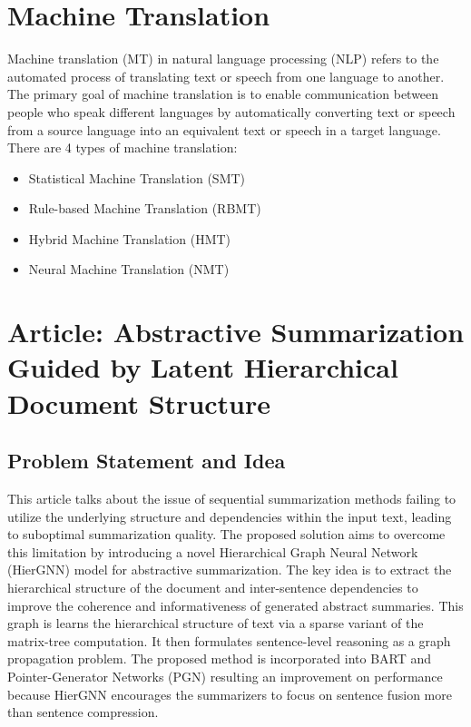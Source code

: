 \documentclass{article}
\begin{document}
\section{Machine Translation}
Machine translation (MT) in natural language processing (NLP) refers to the automated process of translating text or speech from one language to another. The primary goal of machine translation is to enable communication between people who speak different languages by automatically converting text or speech from a source language into an equivalent text or speech in a target language. There are 4 types of machine translation:
\begin{itemize}
  \item Statistical Machine Translation (SMT)
  \item Rule-based Machine Translation (RBMT)
  \item Hybrid Machine Translation (HMT)
  \item Neural Machine Translation (NMT)
\end{itemize}
\pagebreak

\section{Article: Abstractive Summarization Guided by Latent Hierarchical Document Structure}

\subsection{Problem Statement and Idea}
This article talks about the issue of sequential summarization methods failing to utilize the underlying structure and dependencies within the input text, leading to suboptimal summarization quality. The proposed solution aims to overcome this limitation by introducing a novel Hierarchical Graph Neural Network (HierGNN) model for abstractive summarization. The key idea is to extract the hierarchical structure of the document and inter-sentence dependencies to improve the coherence and informativeness of generated abstract summaries. This graph is learns the hierarchical structure of text via a sparse variant of the matrix-tree computation. It then formulates sentence-level
reasoning as a graph propagation problem. The proposed method is incorporated into BART and Pointer-Generator Networks (PGN) resulting an improvement on performance because HierGNN encourages the summarizers to focus on sentence fusion more than sentence compression.
\end{document}

